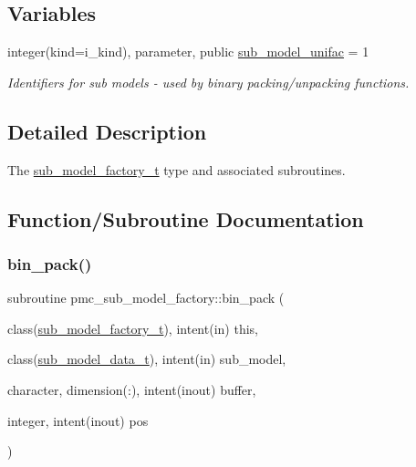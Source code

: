 \subsection*{Variables}
\begin{DoxyCompactItemize}
\item 
integer(kind=i\+\_\+kind), parameter, public \mbox{\hyperlink{namespacepmc__sub__model__factory_ad127121ccbf7246c2d39c3d94349b116}{sub\+\_\+model\+\_\+unifac}} = 1
\begin{DoxyCompactList}\small\item\em Identifiers for sub models -\/ used by binary packing/unpacking functions. \end{DoxyCompactList}\end{DoxyCompactItemize}


\subsection{Detailed Description}
The \mbox{\hyperlink{structpmc__sub__model__factory_1_1sub__model__factory__t}{sub\+\_\+model\+\_\+factory\+\_\+t}} type and associated subroutines. 

\subsection{Function/\+Subroutine Documentation}
\mbox{\label{namespacepmc__sub__model__factory_ac14660d8917b4bf63e286d53535edc9d}} 
\subsubsection{\texorpdfstring{bin\+\_\+pack()}{bin\_pack()}}
{\footnotesize\ttfamily subroutine pmc\+\_\+sub\+\_\+model\+\_\+factory\+::bin\+\_\+pack (\begin{DoxyParamCaption}\item[{class(\mbox{\hyperlink{structpmc__sub__model__factory_1_1sub__model__factory__t}{sub\+\_\+model\+\_\+factory\+\_\+t}}), intent(in)}]{this,  }\item[{class(\mbox{\hyperlink{structpmc__sub__model__data_1_1sub__model__data__t}{sub\+\_\+model\+\_\+data\+\_\+t}}), intent(in)}]{sub\+\_\+model,  }\item[{character, dimension(\+:), intent(inout)}]{buffer,  }\item[{integer, intent(inout)}]{pos }\end{DoxyParamCaption})\hspace{0.3cm}{\ttfamily [private]}}



